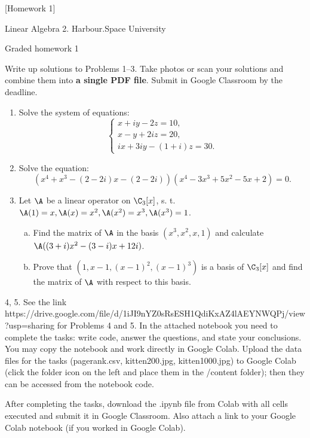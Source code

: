 [Homework 1]

\begin{center}
Linear Algebra 2. Harbour.Space University

Graded homework 1
\end{center}

Write up solutions to Problems 1–3. Take photos or scan your solutions and combine them into {\bf a single PDF file}. Submit in Google Classroom by the deadline.

\begin{enumerate}[1. ]
\item Solve the system of equations:
$$\left\{\begin{array}{l}x+i y-2 z=10, \\ x-y+2 i z=20, \\ i x+3 i y-(1+i) z=30.\end{array}\right.$$

\item Solve the equation:
$$
(x^4 + x^3 - (2 - 2 i) x - (2 - 2 i))(x^4 - 3 x^3 + 5 x^2 - 5 x + 2) = 0.
$$

\item Let $\A$ be a linear operator on $\C_3[x]$, s. t. $\A(1) = x, \A(x) = x^2, \A(x^2) = x^3, \A(x^3) = 1$. 

\begin{enumerate}[a) ]
    \item Find the matrix of $\A$ in the basis $(x^3, x^2, x, 1)$ and calculate $\A((3+i)x^2 - (3 - i)x + 12i)$.
    \item Prove that $(1, x - 1, (x - 1)^2, (x-1)^3)$ is a basis of $\C_3[x]$ and find the matrix of $\A$ with respect to this basis.
\end{enumerate}
\end{enumerate}

4, 5. See the link https://drive.google.com/file/d/1iJI9nYZ0sRsESH1QdiKxAZ4lAEYNWQPj/view?usp=sharing for Problems 4 and 5. In the attached notebook you need to complete the tasks: write code, answer the questions, and state your conclusions. You may copy the notebook and work directly in Google Colab. Upload the data files for the tasks (pagerank.csv, kitten200.jpg, kitten1000.jpg) to Google Colab (click the folder icon on the left and place them in the /content folder); then they can be accessed from the notebook code. 

After completing the tasks, download the .ipynb file from Colab with all cells executed and submit it in Google Classroom. Also attach a link to your Google Colab notebook (if you worked in Google Colab).